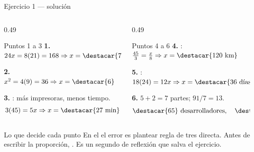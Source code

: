\documentclass[aspectratio=169,10pt]{beamer}
\begin{document}
\begin{frame}{Ejercicio 1 — solución}
  \scriptsize
  \begin{columns}[T,onlytextwidth]
    \begin{column}{0.49\textwidth}
      \begin{block}{Puntos 1 a 3}
        \tiny
        \textbf{1.} $24x = 8(21) = 168 \Rightarrow x = \destacar{7}$

        \vspace{0.08cm}
        \textbf{2.} $x^2 = 4(9) = 36 \Rightarrow x = \destacar{6}$

        \vspace{0.08cm}
        \textbf{3.} : más impresoras, menos tiempo.
        \[ 3(45) = 5x \Rightarrow x = \destacar{27 \text{ min}} \]
      \end{block}
    \end{column}
    \begin{column}{0.49\textwidth}
      \begin{block}{Puntos 4 a 6}
        \tiny
        \textbf{4.} : $\tfrac{45}{3} = \tfrac{x}{8}
        \Rightarrow x = \destacar{120 \text{ km}}$

        \vspace{0.08cm}
        \textbf{5.} : $18(24) = 12x \Rightarrow
        x = \destacar{36 \text{ días}}$

        \vspace{0.08cm}
        \textbf{6.} $5+2 = 7$ partes; $91/7 = 13$.
        \[ \destacar{65} \text{ desarrolladores},\quad
           \destacar{26} \text{ testers} \]
      \end{block}
    \end{column}
  \end{columns}

  \vspace{0.08cm}
  \begin{alertblock}{Lo que decide cada punto}
    \tiny
    En el  el error es plantear regla de tres directa. Antes
    de escribir la proporción, . Es un segundo de reflexión que salva el ejercicio.
  \end{alertblock}
\end{frame}
\end{document}
